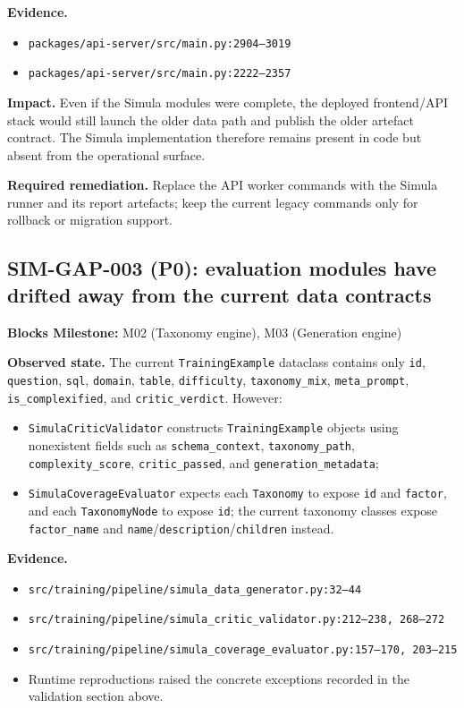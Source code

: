 \textbf{Evidence.}
\begin{itemize}
  \item \texttt{packages/api-server/src/main.py:2904--3019}
  \item \texttt{packages/api-server/src/main.py:2222--2357}
\end{itemize}

\textbf{Impact.}
Even if the Simula modules were complete, the deployed frontend/API
stack would still launch the older data path and publish the older
artefact contract. The Simula implementation therefore remains
present in code but absent from the operational surface.

\textbf{Required remediation.}
Replace the API worker commands with the Simula runner and its report
artefacts; keep the current legacy commands only for rollback or
migration support.

\subsection*{SIM-GAP-003 (P0): evaluation modules have drifted away from the current data contracts}
\label{gap:sim-003}
\textbf{Blocks Milestone:} M02 (Taxonomy engine), M03 (Generation engine)

\textbf{Observed state.}
The current \texttt{TrainingExample} dataclass contains only
\texttt{id}, \texttt{question}, \texttt{sql}, \texttt{domain},
\texttt{table}, \texttt{difficulty}, \texttt{taxonomy\_mix},
\texttt{meta\_prompt}, \texttt{is\_complexified}, and
\texttt{critic\_verdict}. However:
\begin{itemize}
  \item \texttt{SimulaCriticValidator} constructs
    \texttt{TrainingExample} objects using nonexistent fields such as
    \texttt{schema\_context}, \texttt{taxonomy\_path},
    \texttt{complexity\_score}, \texttt{critic\_passed}, and
    \texttt{generation\_metadata};
  \item \texttt{SimulaCoverageEvaluator} expects each
    \texttt{Taxonomy} to expose \texttt{id} and \texttt{factor}, and
    each \texttt{TaxonomyNode} to expose \texttt{id}; the current
    taxonomy classes expose \texttt{factor\_name} and
    \texttt{name}/\texttt{description}/\texttt{children} instead.
\end{itemize}

\textbf{Evidence.}
\begin{itemize}
  \item \texttt{src/training/pipeline/simula\_data\_generator.py:32--44}
  \item \texttt{src/training/pipeline/simula\_critic\_validator.py:212--238, 268--272}
  \item \texttt{src/training/pipeline/simula\_coverage\_evaluator.py:157--170, 203--215}
  \item Runtime reproductions raised the concrete exceptions recorded
    in the validation section above.
\end{itemize}

